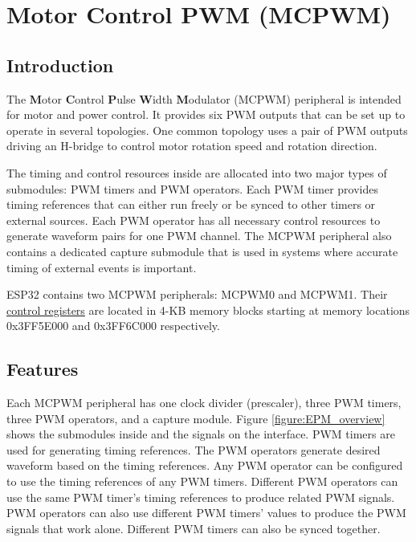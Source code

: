 \documentclass[main\_\_EN.tex]{subfiles}
\begin{document}
\setenglishformatting

\ifglobal
\else
    \listoftodos
    {\let\clearpage\relax \listofdonetodos}
    \tableofcontents
\fi



\hypertarget{mcpwm}{}
\chapter{Motor Control PWM (MCPWM)}
\label{mod:mcpwm}

\section{Introduction}
The \textbf{M}otor \textbf{C}ontrol \textbf{P}ulse \textbf{W}idth \textbf{M}odulator (MCPWM) peripheral is intended for motor and power control. It provides six PWM outputs that can be set up to operate in several topologies. One common topology uses a pair of PWM outputs driving an H-bridge to control motor rotation speed and rotation direction.

The timing and control resources inside are allocated into two major types of submodules: PWM timers and PWM operators. Each PWM timer provides timing references that can either run freely or be synced to other timers or external sources. Each PWM operator has all necessary control resources to generate waveform pairs for one PWM channel. The MCPWM peripheral also contains a dedicated capture submodule that is used in systems where accurate timing of external events is important.

ESP32 contains two MCPWM peripherals: MCPWM0 and MCPWM1. Their \hyperref[section:register_summary]{control registers} are located in 4-KB memory blocks starting at memory locations 0x3FF5E000 and 0x3FF6C000 respectively.

\section{Features}
Each MCPWM peripheral has one clock divider (prescaler), three PWM timers, three PWM operators, and a capture module. Figure \ref{figure:EPM_overview} shows the submodules inside and the signals on the interface. PWM timers are used for generating timing references. The PWM operators generate desired waveform based on the timing references. Any PWM operator can be configured to use the timing references of any PWM timers. Different PWM operators can use the same PWM timer's timing references to produce related PWM signals. PWM operators can also use different PWM timers' values to produce the PWM signals that work alone. Different PWM timers can also be synced together.
\end{document}
